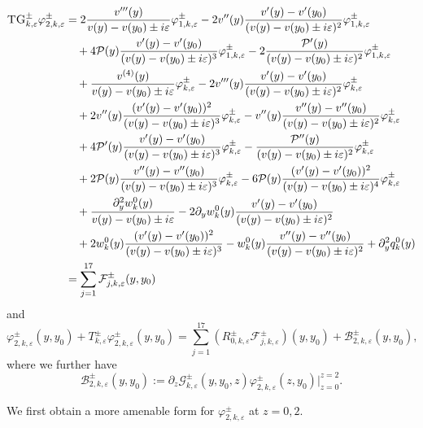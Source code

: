 \documentclass[11pt,reqno]{amsproc}
\theoremstyle{definition}
\numberwithin{equation}{section}
\newcommand{\B}{{\mathcal{B}}}
\newcommand{\F}{{\mathcal F}}
\newcommand{\G}{{\mathcal{G}}}
\newcommand{\ep}{\varepsilon}
\renewcommand{\P}{{\mathcal{P}}}
\begin{document}
\begin{equation}\label{eq:TGvarphi2}
\begin{split}
\textsc{TG}_{k,\ep}^\pm\varphi_{2,k,\ep}^\pm &= 2\frac{v'''(y)}{v(y) - v(y_0) \pm i\ep}\varphi_{1,k,\ep}^\pm - 2v''(y) \frac{v'(y)-v'(y_0)}{(v(y) - v(y_0)\pm i\ep)^2} \varphi_{1,k,\ep}^\pm  \\
&\quad + 4\P(y)\frac{v'(y) - v'(y_0)}{(v(y) - v(y_0) \pm i\ep)^3}\varphi_{1,k,\ep}^\pm - 2\frac{\P'(y)}{(v(y) - v(y_0)\pm i\ep)^2}\varphi_{1,k,\ep}^\pm  \\
&\quad + \frac{v^{(4)}(y)}{v(y) - v(y_0)\pm i\ep}\varphi_{k,\ep}^\pm  -2 v'''(y) \frac{v'(y) - v'(y_0)}{(v(y) - v(y_0)\pm i\ep)^2}\varphi_{k,\ep}^\pm \\
&\quad + 2v''(y) \frac{(v'(y) - v'(y_0))^2}{(v(y) - v(y_0)\pm i\ep)^3}\varphi_{k,\ep}^\pm - v''(y) \frac{v''(y) - v''(y_0)}{(v(y) - v(y_0)\pm i\ep)^2}\varphi_{k,\ep}^\pm \\   
&\quad +4\P'(y)\frac{v'(y) - v'(y_0)}{(v(y) - v(y_0)\pm i\ep)^3}\varphi_{k,\ep}^\pm - \frac{\P''(y)}{(v(y) - v(y_0) \pm i\ep)^2}\varphi_{k,\ep}^\pm     \\
&\quad + 2\P(y) \frac{v''(y) - v''(y_0)}{(v(y) - v(y_0) \pm i\ep)^3}\varphi_{k,\ep}^\pm - 6 \P(y)\frac{(v'(y) - v'(y_0))^2}{(v(y) - v(y_0) \pm i\ep)^4}\varphi_{k,\ep}^\pm\\
&\quad + \frac{\partial_y^2 w_k^0(y)}{v(y) - v(y_0)\pm i\ep} - 2\partial_y w_k^0(y)\frac{v'(y) - v'(y_0)}{(v(y) - v(y_0) \pm i\ep)^2} \\
&\quad + 2 w_k^0(y)\frac{(v'(y) - v'(y_0))^2}{(v(y) - v(y_0)\pm i\ep)^3} - w_k^0(y) \frac{v''(y) - v''(y_0)}{(v(y) - v(y_0)\pm i\ep)^2} + \partial_y^2 q_k^0(y)\\
&=\sum_{j=1}^{17} \F_{j,k,\ep}^\pm(y,y_0)
\end{split}
\end{equation}
and 
\begin{equation}\label{eq:LAPvarphi2}
\varphi_{2,k,\ep}^\pm(y,y_0) + T_{k,\ep}^\pm \varphi_{2,k,\ep}^\pm(y,y_0) =\sum_{j=1}^{17} \left( R_{0,k,\ep}^\pm \F_{j,k,\ep}^\pm \right)(y,y_0) + \B_{2,k,\ep}^\pm(y,y_0),
\end{equation}
where we further have
\begin{equation}\label{eq:defB2}
\B_{2,k,\ep}^\pm(y,y_0) := \partial_z \G_{k,\ep}^\pm(y,y_0,z) \varphi_{2,k,\ep}^\pm(z,y_0)\Big|_{z=0}^{z=2}.
\end{equation}

We first obtain a more amenable form for $\varphi_{2,k,\ep}^\pm$ at $z=0,2$.
\end{document}
